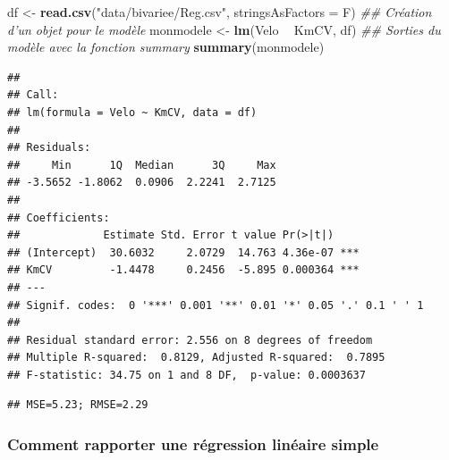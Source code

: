 \documentclass[
  11pt,
  french,
]{book}
\makeatletter
\newenvironment{Shaded}{\begin{snugshade}}{\end{snugshade}}
\newcommand{\CommentTok}[1]{\textcolor[rgb]{0.56,0.35,0.01}{\textit{#1}}}
\newcommand{\DataTypeTok}[1]{\textcolor[rgb]{0.13,0.29,0.53}{#1}}
\newcommand{\DecValTok}[1]{\textcolor[rgb]{0.00,0.00,0.81}{#1}}
\newcommand{\KeywordTok}[1]{\textcolor[rgb]{0.13,0.29,0.53}{\textbf{#1}}}
\newcommand{\NormalTok}[1]{#1}
\newcommand{\OperatorTok}[1]{\textcolor[rgb]{0.81,0.36,0.00}{\textbf{#1}}}
\newcommand{\StringTok}[1]{\textcolor[rgb]{0.31,0.60,0.02}{#1}}
\newenvironment{kframe}{%
\medskip{}
\setlength{\fboxsep}{.8em}
 \def\at@end@of@kframe{}%
 \ifinner\ifhmode%
  \def\at@end@of@kframe{\end{minipage}}%
  \begin{minipage}{\columnwidth}%
 \fi\fi%
 \def\FrameCommand##1{\hskip\@totalleftmargin \hskip-\fboxsep
 \colorbox{shadecolor}{##1}\hskip-\fboxsep
     \hskip-\linewidth \hskip-\@totalleftmargin \hskip\columnwidth}%
 \MakeFramed {\advance\hsize-\width
   \@totalleftmargin\z@ \linewidth\hsize
   \@setminipage}}%
 {\par\unskip\endMakeFramed%
 \at@end@of@kframe}
\renewenvironment{Shaded}{\begin{kframe}}{\end{kframe}}
\makeatother
\begin{document}
\begin{Shaded}
\begin{Highlighting}[]
\NormalTok{df <-}\StringTok{ }\KeywordTok{read.csv}\NormalTok{(}\StringTok{"data/bivariee/Reg.csv"}\NormalTok{, }\DataTypeTok{stringsAsFactors =}\NormalTok{ F)}
\CommentTok{## Création d'un objet pour le modèle}
\NormalTok{monmodele <-}\StringTok{ }\KeywordTok{lm}\NormalTok{(Velo }\OperatorTok{~}\StringTok{ }\NormalTok{KmCV, df)}
\CommentTok{## Sorties du modèle avec la fonction summary}
\KeywordTok{summary}\NormalTok{(monmodele)}
\end{Highlighting}
\end{Shaded}

\begin{verbatim}
## 
## Call:
## lm(formula = Velo ~ KmCV, data = df)
## 
## Residuals:
##     Min      1Q  Median      3Q     Max 
## -3.5652 -1.8062  0.0906  2.2241  2.7125 
## 
## Coefficients:
##             Estimate Std. Error t value Pr(>|t|)    
## (Intercept)  30.6032     2.0729  14.763 4.36e-07 ***
## KmCV         -1.4478     0.2456  -5.895 0.000364 ***
## ---
## Signif. codes:  0 '***' 0.001 '**' 0.01 '*' 0.05 '.' 0.1 ' ' 1
## 
## Residual standard error: 2.556 on 8 degrees of freedom
## Multiple R-squared:  0.8129,	Adjusted R-squared:  0.7895 
## F-statistic: 34.75 on 1 and 8 DF,  p-value: 0.0003637
\end{verbatim}

\begin{Shaded}
\end{Shaded}

\begin{verbatim}
## MSE=5.23; RMSE=2.29
\end{verbatim}

\hypertarget{sect04145}{%
\subsubsection{Comment rapporter une régression linéaire simple}\label{sect04145}}
\end{document}
